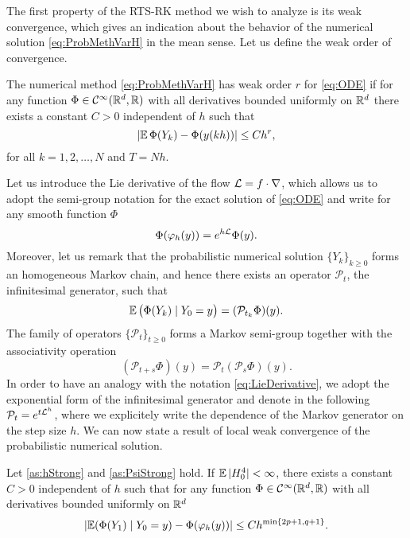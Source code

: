 \documentclass[10pt]{article}
\begin{document}
The first property of the RTS-RK method we wish to analyze is its weak convergence, which gives an indication about the behavior of the numerical solution \eqref{eq:ProbMethVarH} in the mean sense. Let us define the weak order of convergence. 
\begin{definition} The numerical method \eqref{eq:ProbMethVarH} has weak order $r$ for \eqref{eq:ODE} if for any function $\Phi\in \mathcal C^\infty(\mathbb{R}^d, \mathbb{R})$ with all derivatives bounded uniformly on $\mathbb{R}^d$ there exists a constant $C > 0$ independent of $h$ such that
	\begin{equation}
		\lvert\operatorname{\mathbb{E}}\Phi(Y_k) - \Phi(y(kh))\rvert \leq Ch^r,
	\end{equation}
	for all $k = 1, 2, \ldots, N$ and $T = Nh$.
\end{definition} 
Let us introduce the Lie derivative of the flow $\mathcal{L} = f \cdot \nabla$, which allows us to adopt the semi-group notation for the exact solution of \eqref{eq:ODE} and write for any smooth function $\Phi$
\begin{equation}\label{eq:LieDerivative}
	\Phi(\varphi_h(y)) = e^{h\mathcal{L}} \Phi(y).
\end{equation}
Moreover, let us remark that the probabilistic numerical solution $\{Y_k\}_{k\geq 0}$ forms an homogeneous Markov chain, and hence there exists an operator $\mathcal{P}_t$, the infinitesimal generator, such that
\begin{equation}
	\operatorname{\mathbb{E}} \big(\Phi(Y_{k})\mid Y_0 = y\big) = (\mathcal{P}_{t_k}\Phi)(y).
\end{equation}
The family of operators $\{\mathcal{P}_t\}_{t\geq 0}$ forms a Markov semi-group together with the associativity operation
\begin{equation}
	(\mathcal{P}_{t+s}\Phi)(y) = \mathcal{P}_t(\mathcal{P}_s \Phi)(y).
\end{equation}
In order to have an analogy with the notation \eqref{eq:LieDerivative}, we adopt the exponential form of the infinitesimal generator and denote in the following $\mathcal{P}_t = e^{t\mathcal{L}^h}$, where we explicitely write the dependence of the Markov generator on the step size $h$. We can now state a result of local weak convergence of the probabilistic numerical solution.
\begin{lemma}\label{thm:WeakLocalOrder} Let \cref{as:hStrong} and \cref{as:PsiStrong} hold. If $\operatorname{\mathbb{E}}|H_0^4| < \infty$, there exists a constant $C > 0$ independent of $h$ such that for any function $\Phi\in \mathcal{C}^{\infty}(\mathbb{R}^d,\mathbb{R})$ with all derivatives bounded uniformly on $\mathbb{R}^d$
	\begin{equation}
		\lvert\operatorname{\mathbb{E}}(\Phi(Y_1)\mid Y_0 = y) - \Phi(\varphi_h(y))\rvert \leq C h^{\min\{2p+1, q+1\}}.
	\end{equation}
\end{lemma}
\end{document}
